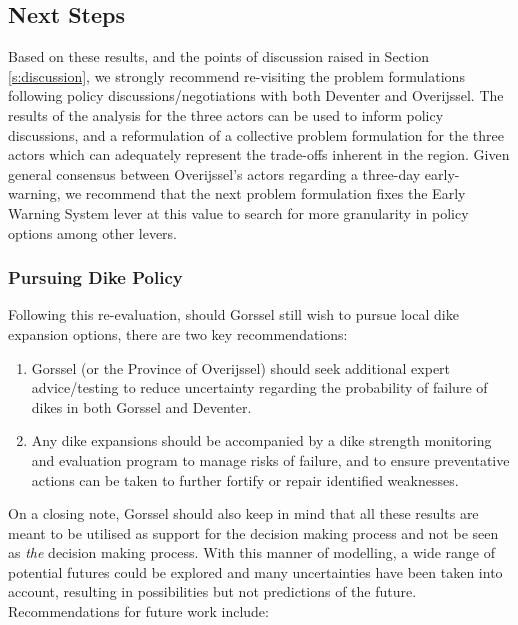 \subsection{Next Steps}
Based on these results, and the points of discussion raised in Section \ref{s:discussion}, we strongly recommend re-visiting the problem formulations following policy discussions/negotiations with both Deventer and Overijssel. The results of the analysis for the three actors can be used to inform policy discussions, and a reformulation of a collective problem formulation for the three actors which can adequately represent the trade-offs inherent in the region. Given general consensus between Overijssel's actors regarding a three-day early-warning, we recommend that the next problem formulation fixes the Early Warning System lever at this value to search for more granularity in policy options among other levers.

\subsubsection{Pursuing Dike Policy}
Following this re-evaluation, should Gorssel still wish to pursue local dike expansion options, there are two key recommendations:
\begin{enumerate}
    \item Gorssel (or the Province of Overijssel) should seek additional expert advice/testing to reduce uncertainty regarding the probability of failure of dikes in both Gorssel and Deventer.
    \item Any dike expansions should be accompanied by a dike strength monitoring and evaluation program to manage risks of failure, and to ensure preventative actions can be taken to further fortify or repair identified weaknesses.
\end{enumerate}

\noindent On a closing note, Gorssel should also keep in mind that all these results are meant to be utilised as support for the decision making process and not be seen as \textit{the} decision making process. With this manner of modelling, a wide range of potential futures could be explored and many uncertainties have been taken into account, resulting in possibilities but not predictions of the future. Recommendations for future work include: 

